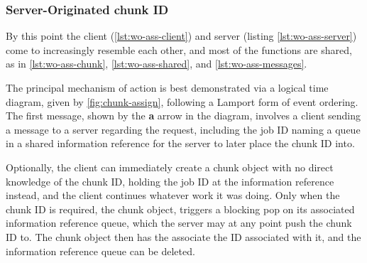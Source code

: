 
\subsubsection{Server-Originated chunk ID}

By this point the client (\cref{lst:wo-ass-client}) and server (listing
\cref{lst:wo-ass-server}) come to increasingly resemble each other, and most of
the functions are shared, as in \cref{lst:wo-ass-chunk},
\cref{lst:wo-ass-shared}, and \cref{lst:wo-ass-messages}.


The principal mechanism of action is best demonstrated via a logical time
diagram, given by \cref{fig:chunk-assign}, following a Lamport form of
event ordering\cite{lamport1978ordering}.
The first message, shown by the \textbf{a} arrow in the diagram, involves a
client sending a message to a server regarding the request, including the job
ID naming a queue in a shared information reference for the server to later
place the chunk ID into.

Optionally, the client can immediately create a chunk object with no direct
knowledge of the chunk ID, holding the job ID at the information reference
instead, and the client continues whatever work it was doing.
Only when the chunk ID is required, the chunk object, triggers a blocking pop
on its associated information reference queue, which the server may
at any point push the chunk ID to.
The chunk object then has the associate the ID associated with it, and the
information reference queue can be deleted.


